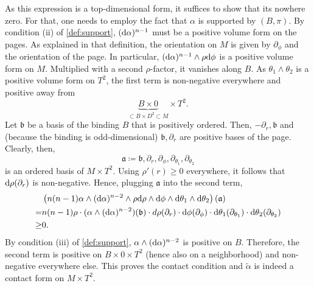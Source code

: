 As this expression is a top-dimensional form, it suffices to show that its nowhere zero.
For that, one needs to employ the fact that $\alpha$ is supported by $(B, \pi)$.
By condition (ii) of \cref{def:support}, $(\mathrm{d} \alpha)^{n-1}$ must be a positive volume form on the pages. 
As explained in that definition, the orientation on $M$ is given by $\partial_\phi$ and the orientation of the page. 
In particular, $(\mathrm{d} \alpha)^{n-1} \wedge \rho \mathrm{d} \phi$ is a positive volume form on $M$. 
Multiplied with a second $\rho$-factor, it vanishes along $B$. 
As $\theta_1 \wedge \theta_2$ is a positive volume form on $T^2$, the first term is non-negative everywhere and positive away from 
\[
    \underbrace{B \times 0}_{\subset B \times D^2 \subset M} \times T^2.
\]
Let $\mathfrak{b}$ be a basis of the binding $B$ that is positively ordered. 
Then, $- \partial_r, \mathfrak{b}$ and (because the binding is odd-dimensional) $\mathfrak{b}, \partial_r$ are positive bases of the page. Clearly, then, 
\[ 
    \mathfrak{a} \coloneqq \mathfrak{b}, \partial_r, \partial_\phi, \partial_{\theta_1}, \partial_{\theta_2}
\] 
is an ordered basis of $M\times T^2$.
Using $\rho'(r) \geq 0$ everywhere, it follows that $\mathrm{d} \rho(\partial_r)$ is non-negative.
Hence, plugging $\mathfrak{a}$ into the second term,
\begin{align*}
    &\left(n(n-1)\alpha \wedge (\mathrm{d} \alpha)^{n-2}\wedge \rho \mathrm{d}\rho \wedge \mathrm{d} \phi \wedge \mathrm{d} \theta_1 \wedge \mathrm{d} \theta_2\right)(\mathfrak{a})\\
    =& n(n-1) \rho \cdot (\alpha \wedge (\mathrm{d} \alpha)^{n-2})(\mathfrak{b}) \cdot d\rho(\partial_r) \cdot \mathrm{d} \phi(\partial_\phi) \cdot \mathrm{d} \theta_1(\partial_{\theta_1}) \cdot \mathrm{d} \theta_2(\partial_{\theta_2})\\
    \geq& 0.
\end{align*}
By condition (iii) of \cref{def:support}, $\alpha \wedge (\mathrm{d} \alpha)^{n-2}$ is positive on $B$. 
Therefore, the second term is positive on $B \times 0 \times T^2$ (hence also on a neighborhood) and non-negative everywhere else.
This proves the contact condition and $\tilde \alpha$ is indeed a contact form on $M\times T^2$.
